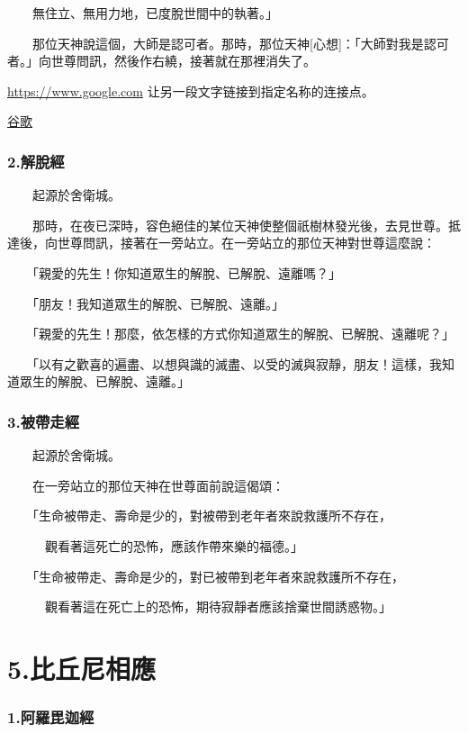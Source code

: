 \documentclass[12pt,oneside]{book}
\begin{document}
　　無住立、無用力地，已度脫世間中的執著。」

　　那位天神說這個，大師是認可者。那時，那位天神[心想]：「大師對我是認可者。」向世尊問訊，然後作右繞，接著就在那裡消失了。

\hyperlink{sn 1.1}{https://www.google.com} 让另一段文字链接到指定名称的连接点。

\href{https://www.google.com}{谷歌}

\subsection{2.解脫經}
　　起源於舍衛城。

　　那時，在夜已深時，容色絕佳的某位天神使整個祇樹林發光後，去見世尊。抵達後，向世尊問訊，接著在一旁站立。在一旁站立的那位天神對世尊這麼說：

　　「親愛的先生！你知道眾生的解脫、已解脫、遠離嗎？」

　　「朋友！我知道眾生的解脫、已解脫、遠離。」

　　「親愛的先生！那麼，依怎樣的方式你知道眾生的解脫、已解脫、遠離呢？」

　　「以有之歡喜的遍盡、以想與識的滅盡、以受的滅與寂靜，朋友！這樣，我知道眾生的解脫、已解脫、遠離。」

\subsection{3.被帶走經}

　　起源於舍衛城。

　　在一旁站立的那位天神在世尊面前說這偈頌：

　　「生命被帶走、壽命是少的，對被帶到老年者來說救護所不存在，

　　　觀看著這死亡的恐怖，應該作帶來樂的福德。」

　　「生命被帶走、壽命是少的，對已被帶到老年者來說救護所不存在，

　　　觀看著這在死亡上的恐怖，期待寂靜者應該捨棄世間誘惑物。」

\chapter{5.比丘尼相應}

\subsection{1.阿羅毘迦經}
\label{subsec:5.1ss}
\end{document}
